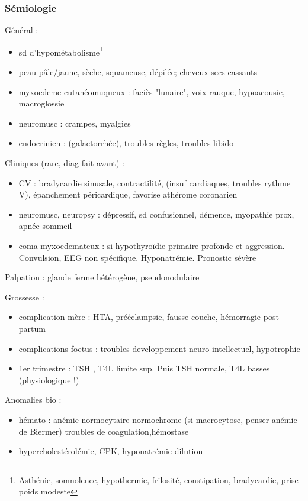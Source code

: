 \documentclass[11pt]{article}
\begin{document}
\subsubsection{Sémiologie}
\label{sec:org14b3c10}
Général :
\begin{itemize}
\item sd d'hypométabolisme\footnote{Asthénie, somnolence, hypothermie, frilosité, constipation, bradycardie,
prise poids modeste}
\item peau pâle/jaune, sèche, squameuse, dépilée; cheveux secs cassants
\item myxoedeme cutanéomuqueux : faciès "lunaire", voix rauque, hypoacousie,
macroglossie
\item neuromusc : crampes, myalgies
\item endocrinien : (galactorrhée), troubles règles, troubles libido
\end{itemize}
Cliniques (rare, diag fait avant) :
\begin{itemize}
\item CV : bradycardie sinusale, \dec contractilité, (insuf cardiaques, troubles
rythme V), épanchement péricardique, favorise athérome coronarien
\item neuromusc, neuropsy : dépressif, sd confusionnel, démence, myopathie prox,
apnée sommeil
\item coma myxoedemateux : si hypothyroïdie primaire profonde et
aggression. Convulsion, EEG non spécifique. Hyponatrémie. Pronostic sévère
\end{itemize}

Palpation : glande ferme hétérogène, pseudonodulaire

Grossesse : 
\begin{itemize}
\item complication mère : HTA, prééclampsie, fausse couche, hémorragie post-partum
\item complications foetus : troubles developpement neuro-intellectuel, hypotrophie
\item 1er trimestre : TSH \dec, T4L limite sup. Puis TSH normale, T4L basses
(physiologique !)
\end{itemize}

Anomalies bio :
\begin{itemize}
\item hémato : anémie normocytaire normochrome (si macrocytose, penser anémie de
Biermer) troubles de coagulation,hémostase
\item hypercholestérolémie, \inc CPK, hyponatrémie dilution
\end{itemize}
\end{document}
